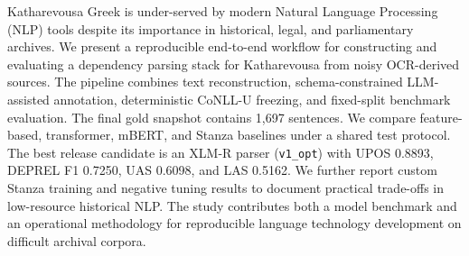 Katharevousa Greek is under-served by modern Natural Language Processing (NLP) tools despite its importance in historical, legal, and parliamentary archives. We present a reproducible end-to-end workflow for constructing and evaluating a dependency parsing stack for Katharevousa from noisy OCR-derived sources. The pipeline combines text reconstruction, schema-constrained LLM-assisted annotation, deterministic CoNLL-U freezing, and fixed-split benchmark evaluation. The final gold snapshot contains 1,697 sentences. We compare feature-based, transformer, mBERT, and Stanza baselines under a shared test protocol. The best release candidate is an XLM-R parser (\texttt{v1\_opt}) with UPOS 0.8893, DEPREL F1 0.7250, UAS 0.6098, and LAS 0.5162. We further report custom Stanza training and negative tuning results to document practical trade-offs in low-resource historical NLP. The study contributes both a model benchmark and an operational methodology for reproducible language technology development on difficult archival corpora.
